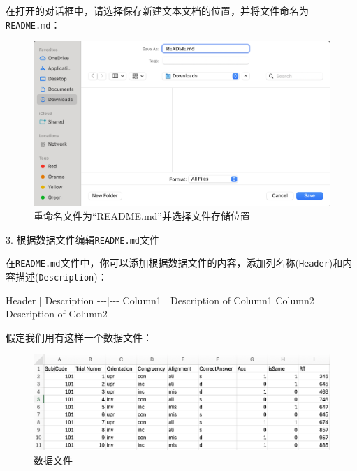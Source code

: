 \documentclass[]{ctexbook}
\newenvironment{Shaded}{\begin{snugshade}}{\end{snugshade}}
\newcommand{\NormalTok}[1]{#1}
\theoremstyle{definition}
\theoremstyle{definition}
\theoremstyle{definition}
\theoremstyle{definition}
\theoremstyle{remark}
\begin{document}
在打开的对话框中，请选择保存新建文本文档的位置，并将文件命名为\texttt{README.md}：

\begin{figure}

{\centering \includegraphics[width=0.8\linewidth]{img/vscode/mkreadme_saveas2} 

}

\caption{重命名文件为“README.md”并选择文件存储位置}\label{fig:mkreadme-saveas2}
\end{figure}

3. 根据数据文件编辑\texttt{README.md}文件

在\texttt{README.md}文件中，你可以添加根据数据文件的内容，添加列名称(\texttt{Header})和内容描述(\texttt{Description})：

\begin{Shaded}
\begin{Highlighting}[]

\NormalTok{Header | Description}
\NormalTok{{-}{-}{-}|{-}{-}{-}}
\NormalTok{Column1 | Description of Column1}
\NormalTok{Column2 | Description of Column2}
\end{Highlighting}
\end{Shaded}

假定我们用有这样一个数据文件：

\begin{figure}

{\centering \includegraphics[width=1\linewidth]{img/vscode/mkreadme_datafile} 

}

\caption{数据文件}\label{fig:mkreadme-datafile}
\end{figure}
\end{document}
